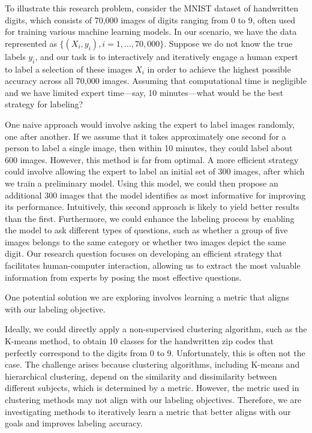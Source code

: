 \documentclass[12pt]{article}
\begin{document}
To illustrate this research problem, consider the MNIST dataset of handwritten digits, which consists of 70,000 images of digits ranging from 0 to 9, often used for training various machine learning models. In our scenario, we have the data represented as \(\{(X_i, y_i), i=1, \ldots, 70,000\}\). Suppose we do not know the true labels \(y_i\), and our task is to interactively and iteratively engage a human expert to label a selection of these images \(X_i\) in order to achieve the highest possible accuracy across all 70,000 images. Assuming that computational time is negligible and we have limited expert time—say, 10 minutes—what would be the best strategy for labeling? 

One naive approach would involve asking the expert to label images randomly, one after another. If we assume that it takes approximately one second for a person to label a single image, then within 10 minutes, they could label about 600 images. However, this method is far from optimal. A more efficient strategy could involve allowing the expert to label an initial set of 300 images, after which we train a preliminary model. Using this model, we could then propose an additional 300 images that the model identifies as most informative for improving its performance. Intuitively, this second approach is likely to yield better results than the first. Furthermore, we could enhance the labeling process by enabling the model to ask different types of questions, such as whether a group of five images belongs to the same category or whether two images depict the same digit. Our research question focuses on developing an efficient strategy that facilitates human-computer interaction, allowing us to extract the most valuable information from experts by posing the most effective questions.

One potential solution we are exploring involves learning a metric that aligns with our labeling objective.

Ideally, we could directly apply a non-supervised clustering algorithm, such as the K-means method, to obtain 10 classes for the handwritten zip codes that perfectly correspond to the digits from 0 to 9. Unfortunately, this is often not the case. The challenge arises because clustering algorithms, including K-means and hierarchical clustering, depend on the similarity and dissimilarity between different subjects, which is determined by a metric. However, the metric used in clustering methods may not align with our labeling objectives. Therefore, we are investigating methods to iteratively learn a metric that better aligns with our goals and improves labeling accuracy.
\end{document}
